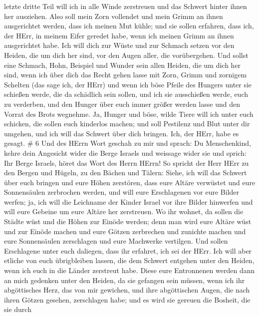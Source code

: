 letzte dritte Teil will ich in alle Winde zerstreuen und das Schwert
hinter ihnen her ausziehen.  Also soll mein Zorn vollendet
und mein Grimm an ihnen ausgerichtet werden, dass ich meinen Mut kühle;
und sie sollen erfahren, dass ich, der HErr, in meinem Eifer geredet
habe, wenn ich meinen Grimm an ihnen ausgerichtet habe. 
Ich will dich zur Wüste und zur Schmach setzen vor den Heiden, die um
dich her sind, vor den Augen aller, die vorübergehen.  Und
sollst eine Schmach, Hohn, Beispiel und Wunder sein allen Heiden, die um
dich her sind, wenn ich über dich das Recht gehen lasse mit Zorn, Grimm
und zornigem Schelten (das sage ich, der HErr)  und wenn
ich böse Pfeile des Hungers unter sie schießen werde, die da schädlich
sein sollen, und ich sie ausschießen werde, euch zu verderben, und den
Hunger über euch immer größer werden lasse und den Vorrat des Brots
wegnehme.  Ja, Hunger und böse, wilde Tiere will ich unter
euch schicken, die sollen euch kinderlos machen; und soll Pestilenz und
Blut unter dir umgehen, und ich will das Schwert über dich bringen. Ich,
der HErr, habe es gesagt. \# 6  Und des HErrn Wort geschah
zu mir und sprach:  Du Menschenkind, kehre dein Angesicht
wider die Berge Israels und weissage wider sie  und sprich:
Ihr Berge Israels, höret das Wort des Herrn HErrn! So spricht der Herr
HErr zu den Bergen und Hügeln, zu den Bächen und Tälern: Siehe, ich will
das Schwert über euch bringen und eure Höhen zerstören, 
dass eure Altäre verwüstet und eure Sonnensäulen zerbrochen werden, und
will eure Erschlagenen vor eure Bilder werfen;  ja, ich will
die Leichname der Kinder Israel vor ihre Bilder hinwerfen und will eure
Gebeine um eure Altäre her zerstreuen.  Wo ihr wohnet, da
sollen die Städte wüst und die Höhen zur Einöde werden; denn man wird
eure Altäre wüst und zur Einöde machen und eure Götzen zerbrechen und
zunichte machen und eure Sonnensäulen zerschlagen und eure Machwerke
vertilgen.  Und sollen Erschlagene unter euch daliegen, dass
ihr erfahret, ich sei der HErr.  Ich will aber etliche von
euch übrigbleiben lassen, die dem Schwert entgehen unter den Heiden,
wenn ich euch in die Länder zerstreut habe.  Diese eure
Entronnenen werden dann an mich gedenken unter den Heiden, da sie
gefangen sein müssen, wenn ich ihr abgöttisches Herz, das von mir
gewichen, und ihre abgöttischen Augen, die nach ihren Götzen gesehen,
zerschlagen habe; und es wird sie gereuen die Bosheit, die sie durch
